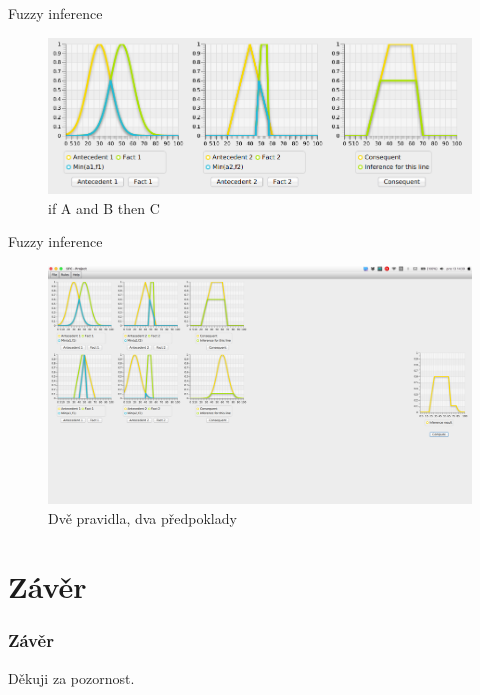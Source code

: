 \documentclass{beamer}
\begin{document}
\begin{frame}{Fuzzy inference}
	
	\begin{figure}[h]
		\centering
		\includegraphics[scale=0.3]{oneRuleTwoFacts}
		\caption{if A and B then C}
	\end{figure}
	
\end{frame}

\begin{frame}{Fuzzy inference}
	
	\begin{figure}[h]
		\centering
		\includegraphics[scale=0.3]{twoRulesUpgraded}
		\caption{Dvě pravidla, dva předpoklady}
	\end{figure}
	
\end{frame}


\section{Závěr}
\begin{frame}[fragile]
\frametitle{Závěr}

\centering
Děkuji za pozornost.

\end{frame}
\end{document}
